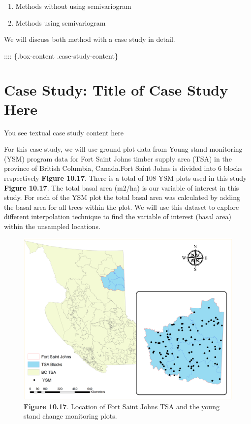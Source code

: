 \documentclass[
]{book}
\providecommand{\tightlist}{%
  \setlength{\itemsep}{0pt}\setlength{\parskip}{0pt}}
\begin{document}
\begin{enumerate}
\def\labelenumi{\arabic{enumi}.}
\tightlist
\item
  Methods without using semivariogram
\item
  Methods using semivariogram
\end{enumerate}

We will discuss both method with a case study in detail.

:::: \{.box-content .case-study-content\}

\hypertarget{case-study-title-of-case-study-here-4}{%
\section{Case Study: Title of Case Study Here}\label{case-study-title-of-case-study-here-4}}

You see textual case study content here

For this case study, we will use ground plot data from Young stand monitoring (YSM) program data \citep{ProvinceofBC2018} for Fort Saint Johns timber supply area (TSA) in the province of British Columbia, Canada.Fort Saint Johns is divided into 6 blocks respectively \textbf{Figure 10.17}. There is a total of 108 YSM plots used in this study \textbf{Figure 10.17}. The total basal area (m2/ha) is our variable of interest in this study. For each of the YSM plot the total basal area was calculated by adding the basal area for all trees within the plot. We will use this dataset to explore different interpolation technique to find the variable of interest (basal area) within the unsampled locations.

\begin{figure}
\centering
\includegraphics{images/10-FSJ-plot.png}
\caption{\textbf{Figure 10.17}. Location of Fort Saint Johns TSA and the young stand change monitoring plots.}
\end{figure}
\end{document}
